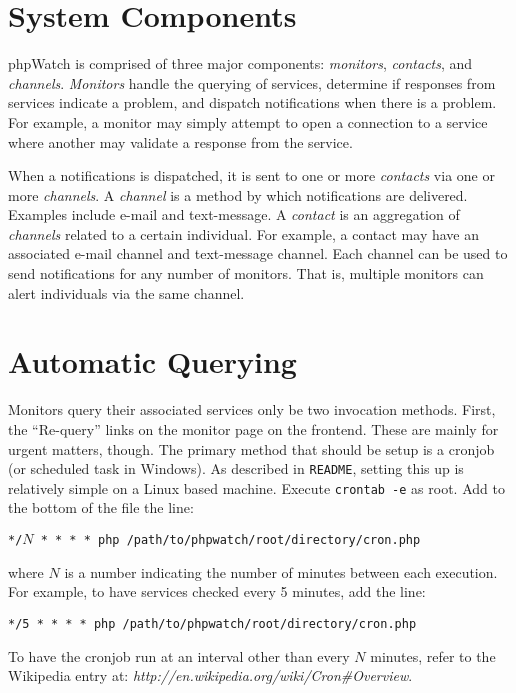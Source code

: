 \documentclass[10pt]{article}
\begin{document}
\section{System Components}
phpWatch is comprised of three major components: \emph{monitors}, \emph{contacts}, and \emph{channels}.  \emph{Monitors}
handle the querying of services, determine if responses from services indicate a problem, and dispatch notifications
when there is a problem.  For example, a monitor may simply attempt to open a connection to a service where another may
validate a response from the service.

When a notifications is dispatched, it is sent to one or more \emph{contacts} via one or more \emph{channels}.  A
\emph{channel} is a method by which notifications are delivered.  Examples include e-mail and text-message.  A
\emph{contact} is an aggregation of \emph{channels} related to a certain individual.  For example, a contact may have an
associated e-mail channel and text-message channel.  Each channel can be used to send notifications for any number of
monitors.  That is, multiple monitors can alert individuals via the same channel.

\section{Automatic Querying}
Monitors query their associated services only be two invocation methods.  First, the ``Re-query'' links on the monitor
page on the frontend.  These are mainly for urgent matters, though.  The primary method that should be setup is a
cronjob (or scheduled task in Windows).  As described in \texttt{README}, setting this up is relatively simple on a
Linux based machine.  Execute \texttt{crontab -e} as root.  Add to the bottom of the file the line:

\begin{center}
    \texttt{*/$N$ * * * * php /path/to/phpwatch/root/directory/cron.php}
\end{center}
where $N$ is a number indicating the number of minutes between each execution.  For example, to have services checked
every 5 minutes, add the line:
\begin{center}
    \texttt{*/5 * * * * php /path/to/phpwatch/root/directory/cron.php}
\end{center}

To have the cronjob run at an interval other than every $N$ minutes, refer to the Wikipedia entry at:
\emph{http://en.wikipedia.org/wiki/Cron\#Overview}.
\end{document}
